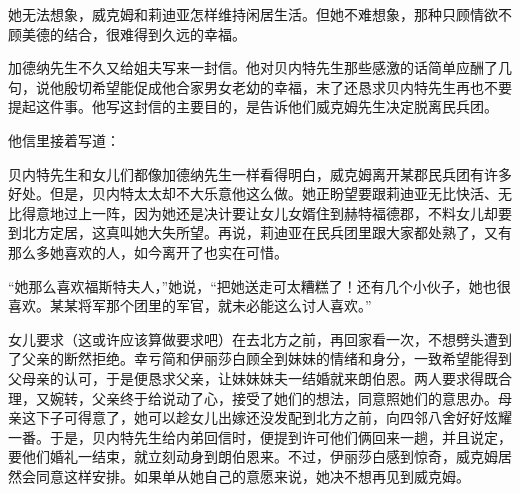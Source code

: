 \par 她无法想象，威克姆和莉迪亚怎样维持闲居生活。但她不难想象，那种只顾情欲不顾美德的结合，很难得到久远的幸福。
\par 加德纳先生不久又给姐夫写来一封信。他对贝内特先生那些感激的话简单应酬了几句，说他殷切希望能促成他合家男女老幼的幸福，末了还恳求贝内特先生再也不要提起这件事。他写这封信的主要目的，是告诉他们威克姆先生决定脱离民兵团。
\par 他信里接着写道：
\par 贝内特先生和女儿们都像加德纳先生一样看得明白，威克姆离开某郡民兵团有许多好处。但是，贝内特太太却不大乐意他这么做。她正盼望要跟莉迪亚无比快活、无比得意地过上一阵，因为她还是决计要让女儿女婿住到赫特福德郡，不料女儿却要到北方定居，这真叫她大失所望。再说，莉迪亚在民兵团里跟大家都处熟了，又有那么多她喜欢的人，如今离开了也实在可惜。
\par “她那么喜欢福斯特夫人，”她说，“把她送走可太糟糕了！还有几个小伙子，她也很喜欢。某某将军那个团里的军官，就未必能这么讨人喜欢。”
\par 女儿要求（这或许应该算做要求吧）在去北方之前，再回家看一次，不想劈头遭到了父亲的断然拒绝。幸亏简和伊丽莎白顾全到妹妹的情绪和身分，一致希望能得到父母亲的认可，于是便恳求父亲，让妹妹妹夫一结婚就来朗伯恩。两人要求得既合理，又婉转，父亲终于给说动了心，接受了她们的想法，同意照她们的意思办。母亲这下子可得意了，她可以趁女儿出嫁还没发配到北方之前，向四邻八舍好好炫耀一番。于是，贝内特先生给内弟回信时，便提到许可他们俩回来一趟，并且说定，要他们婚礼一结束，就立刻动身到朗伯恩来。不过，伊丽莎白感到惊奇，威克姆居然会同意这样安排。如果单从她自己的意愿来说，她决不想再见到威克姆。



